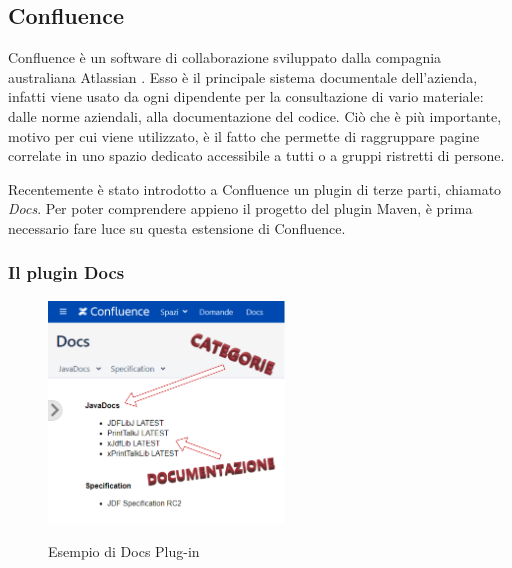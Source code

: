 

    \subsection{Confluence}
    Confluence è un software di collaborazione sviluppato dalla compagnia australiana Atlassian \cite{site:confluence}.
    Esso è il principale sistema documentale dell'azienda, infatti viene usato da ogni dipendente per la consultazione di vario materiale: dalle norme aziendali, alla documentazione del codice.
    Ciò che è più importante, motivo per cui viene utilizzato, è il fatto che permette di raggruppare pagine correlate in uno spazio dedicato accessibile a tutti o a gruppi ristretti di persone.
    
    Recentemente è stato introdotto a Confluence un plugin di terze parti, chiamato \emph{Docs}. 
    Per poter comprendere appieno il progetto del plugin Maven, è prima necessario fare luce su questa estensione di Confluence.

    \subsubsection{Il plugin Docs} \label{pluginDocs}

    \begin{figure}[H]
        \centering
        \includegraphics[width=0.56\textwidth]{immagini/docs-conf.png}\\
        \caption{Esempio di Docs Plug-in}
        \label{screenDocs}
    \end{figure}

